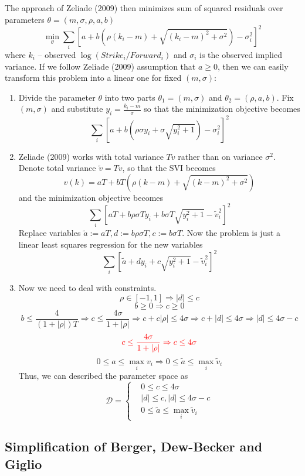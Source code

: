 \documentclass[12pt]{article}
\begin{document}
The approach of Zeliade (2009) then minimizes sum of squared residuals over parameters $\theta = (m, \sigma, \rho, a, b)$
\[\min_{\theta} \sum_{i} \left[a + b\left(\rho (k_i-m) + \sqrt{(k_i-m)^2 + \sigma^2}\right) - \sigma_i^2\right]^2\]
where $k_i$ -- observed $\log(Strike_i/Forward_i)$ and $\sigma_i$ is the observed implied variance. If we follow Zeliade (2009) assumption that $a \ge 0$, then we can easily transform this problem into a linear one for fixed $(m,\sigma)$:
\begin{enumerate}
	\item Divide the parameter $\theta$ into two parts $\theta_1 = (m,\sigma)$ and $\theta_2 = (\rho,a,b)$. Fix $(m,\sigma)$ and substitute $y_i = \frac{k_i - m}{\sigma}$ so that the minimization objective becomes
	\[\sum_{i} \left[a + b\left(\rho \sigma y_i + \sigma\sqrt{y_i^2 + 1}\right) - \sigma_i^2\right]^2\]
	\item Zeliade (2009) works with total variance $Tv$ rather than on variance $\sigma^2$. Denote total variance $\tilde{v} = Tv$, so that the SVI becomes 
	\[v(k) = aT + bT\left(\rho (k-m) + \sqrt{(k-m)^2 + \sigma^2}\right)\]
	and the minimization objective becomes
	\[\sum_{i} \left[aT + b\rho \sigma T y_i + b \sigma T\sqrt{y_i^2 + 1} - \tilde{v}_i^2\right]^2\]
	Replace variables $\tilde{a} := aT, d := b\rho \sigma T, c := b\sigma T$. Now the problem is just a linear least squares regression for the new variables
	\[\sum_{i} \left[\tilde{a} + d y_i + c\sqrt{y_i^2 + 1} - \tilde{v}_i^2\right]^2\]
	\item Now we need to deal with constraints.
	\[\rho \in [-1,1] \Rightarrow |d| \le c\]
	\[b \ge 0 \Rightarrow c \ge 0\]
	\[b \le \frac{4}{(1+|\rho|)T} \Rightarrow c \le \frac{4\sigma}{1+|\rho|} \Rightarrow c + c|\rho| \le 4\sigma \Rightarrow c + |d| \le 4\sigma \Rightarrow |d| \le 4\sigma - c\]
	\[{\color{red} c \le \frac{4\sigma}{1+|\rho|} \Rightarrow c \le 4\sigma}\]
	\[0 \le a \le \max_{i}v_i \Rightarrow 0 \le \tilde{a} \le \max_i \tilde{v}_i\]
	Thus, we can described the parameter space as
	\[\mathcal{D} = \left\{
	\begin{aligned}
		& 0 \le c \le 4\sigma \\
		& |d| \le c, |d| \le 4\sigma - c \\
		& 0 \le \tilde{a} \le \max_i \tilde{v}_i
	\end{aligned}\right.\]

\end{enumerate}

\subsection{Simplification of Berger, Dew-Becker and Giglio}
\end{document}
